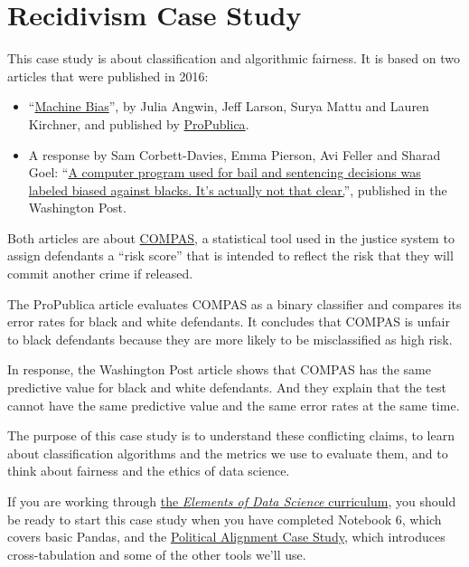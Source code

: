 \hypertarget{recidivism-case-study}{%
\section{Recidivism Case Study}\label{recidivism-case-study}}

This case study is about classification and algorithmic fairness. It is
based on two articles that were published in 2016:

\begin{itemize}
\item
  ``\href{https://www.propublica.org/article/machine-bias-risk-assessments-in-criminal-sentencing}{Machine
  Bias}'', by Julia Angwin, Jeff Larson, Surya Mattu and Lauren
  Kirchner, and published by
  \href{https://www.propublica.org}{ProPublica}.
\item
  A response by Sam Corbett-Davies, Emma Pierson, Avi Feller and Sharad
  Goel:
  ``\href{https://www.washingtonpost.com/news/monkey-cage/wp/2016/10/17/can-an-algorithm-be-racist-our-analysis-is-more-cautious-than-propublicas/}{A
  computer program used for bail and sentencing decisions was labeled
  biased against blacks. It's actually not that clear.}'', published in
  the Washington Post.
\end{itemize}

Both articles are about
\href{https://en.wikipedia.org/wiki/COMPAS_(software)}{COMPAS}, a
statistical tool used in the justice system to assign defendants a
``risk score'' that is intended to reflect the risk that they will
commit another crime if released.

The ProPublica article evaluates COMPAS as a binary classifier and
compares its error rates for black and white defendants. It concludes
that COMPAS is unfair to black defendants because they are more likely
to be misclassified as high risk.

In response, the Washington Post article shows that COMPAS has the same
predictive value for black and white defendants. And they explain that
the test cannot have the same predictive value and the same error rates
at the same time.

The purpose of this case study is to understand these conflicting
claims, to learn about classification algorithms and the metrics we use
to evaluate them, and to think about fairness and the ethics of data
science.

If you are working through
\href{https://allendowney.github.io/ElementsOfDataScience}{the
\emph{Elements of Data Science} curriculum}, you should be ready to
start this case study when you have completed Notebook 6, which covers
basic Pandas, and the
\href{https://allendowney.github.io/PoliticalAlignmentCaseStudy}{Political
Alignment Case Study}, which introduces cross-tabulation and some of the
other tools we'll use.


